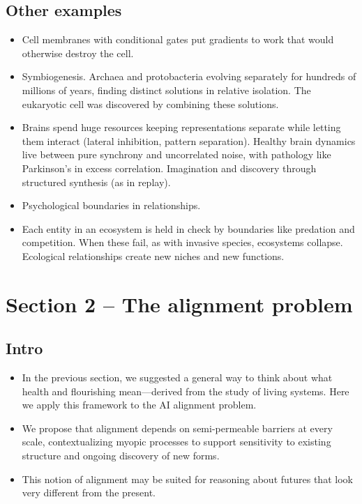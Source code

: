 \documentclass[11pt]{article}
\begin{document}
\subsection*{Other examples}

\begin{itemize}
  \item Cell membranes with conditional gates put gradients to work that would otherwise destroy the cell.
  \item Symbiogenesis. Archaea and protobacteria evolving separately for hundreds of millions of years, finding distinct solutions in relative isolation. The eukaryotic cell was discovered by combining these solutions.
  \item Brains spend huge resources keeping representations separate while letting them interact (lateral inhibition, pattern separation). Healthy brain dynamics live between pure synchrony and uncorrelated noise, with pathology like Parkinson's in excess correlation. Imagination and discovery through structured synthesis (as in replay). 
  \item Psychological boundaries in relationships. 
  \item Each entity in an ecosystem is held in check by boundaries like predation and competition. When these fail, as with invasive species, ecosystems collapse. Ecological relationships create new niches and new functions.
\end{itemize}

\section*{Section 2 -- The alignment problem}

\subsection*{Intro}

\begin{itemize}
  \item In the previous section, we suggested a general way to think about what health and flourishing mean---derived from the study of living systems. Here we apply this framework to the AI alignment problem. 
  \item We propose that alignment depends on semi-permeable barriers at every scale, contextualizing myopic processes to support sensitivity to existing structure and ongoing discovery of new forms.
  \item This notion of alignment may be suited for reasoning about futures that look very different from the present.
\end{itemize}
\end{document}
